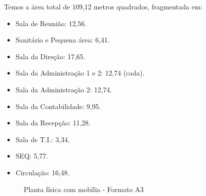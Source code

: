\documentclass[	DIV=calc,%
							paper=a4,%
							fontsize=12pt,%
							onecolumn]{scrartcl}	 					%
\begin{document}
Temos a área total de 109,12 metros quadrados, fragmentada em:

\begin{itemize}
	\item Sala de Reunião: 12,56.
	\item Sanitário e Pequena área: 6,41.
	\item Sala da Direção: 17,65.
	\item Sala da Administração 1 e 2: 12,74 (cada).
	\item Sala da Administração 2: 12,74.
	\item Sala da Contabilidade: 9,95.
	\item Sala da Recepção: 11,28.
	\item Sala de T.I.: 3,34.
	\item SEQ: 5,77.
	\item Circulação: 16,48.
	
	
\end{itemize}


\clearpage 
{}
\recalctypearea



\begin{figure}
	\noindent{}
	\caption{Planta física com mobília - Formato A3}
	\label{fig1}
\end{figure}

\clearpage
{}
\recalctypearea
\end{document}
